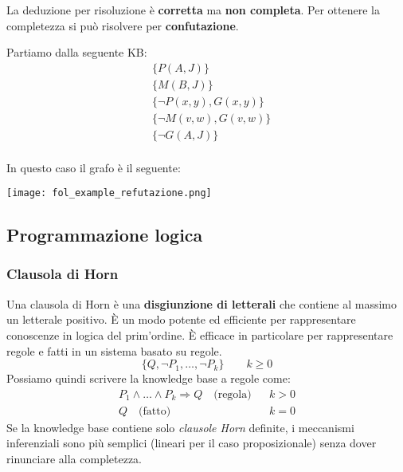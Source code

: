 La deduzione per risoluzione è \textbf{corretta} ma \textbf{non completa}. Per ottenere la completezza si può risolvere per \textbf{confutazione}.
\begin{example}
	Partiamo dalla seguente KB:
	\begin{align*}
		&\{P(A, J)\}\\
		& \{M(B, J)\}\\
		&\{\neg P(x,y), G(x,y)\}\\
		&\{\neg M(v,w), G(v,w)\}\\
		& \{\neg G(A, J)\}
	\end{align*}\\
	In questo caso il grafo è il seguente:
	\begin{center}
		\texttt{[image: fol\_example\_refutazione.png]}
	\end{center}
\end{example}

\subsection{Programmazione logica}
\subsubsection{Clausola di Horn}
Una clausola di Horn è una \textbf{disgiunzione di letterali} che contiene al massimo un letterale positivo. È un modo potente ed efficiente per rappresentare conoscenze in logica del prim'ordine. È efficace in particolare per rappresentare regole e fatti in un sistema basato su regole.
\begin{equation}
	\{Q, \neg P_1, \ldots, \neg P_k\}\quad\quad k\geq 0
\end{equation} 
Possiamo quindi scrivere la knowledge base a regole come:
\begin{align*}
	P_1 \land \ldots \land P_k \Rightarrow Q \quad \text{(regola)}&& k>0 \\
	Q \quad\text{(fatto)}&& k=0
\end{align*}
Se la knowledge base contiene solo \textit{clausole Horn} definite, i meccanismi inferenziali sono più semplici (lineari per il caso proposizionale) senza dover rinunciare alla completezza.
